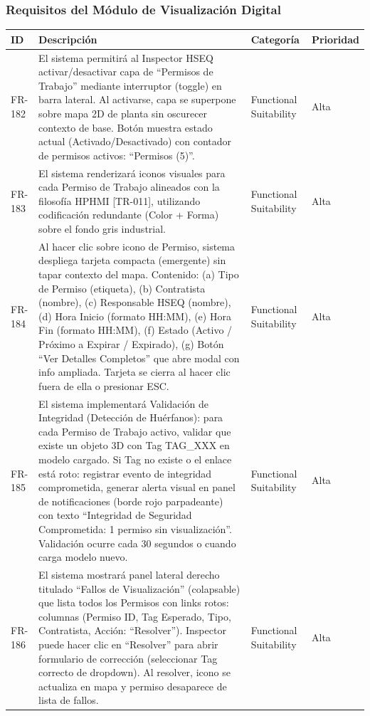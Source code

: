 \subsubsection{Requisitos del Módulo de Visualización Digital}
\footnotesize
\begin{longtable}{>{\raggedright\arraybackslash}p{} >{\raggedright\arraybackslash}p{} >{\raggedright\arraybackslash}p{} >{\raggedright\arraybackslash}p{}}
\toprule
\rowcolor{gray!15}\textbf{ID} & \textbf{Descripción} & \textbf{Categoría} & \textbf{Prioridad} \\ \midrule
\endhead
FR-182 & El sistema permitirá al Inspector HSEQ activar/desactivar capa de ``Permisos de Trabajo'' mediante interruptor (toggle) en barra lateral. Al activarse, capa se superpone sobre mapa 2D de planta sin oscurecer contexto de base. Botón muestra estado actual (Activado/Desactivado) con contador de permisos activos: ``Permisos (5)''. & Functional Suitability & Alta \\
FR-183 & El sistema renderizará iconos visuales para cada Permiso de Trabajo alineados con la filosofía HPHMI [TR-011], utilizando codificación redundante (Color + Forma) sobre el fondo gris industrial. & Functional Suitability & Alta \\
FR-184 & Al hacer clic sobre icono de Permiso, sistema despliega tarjeta compacta (emergente) sin tapar contexto del mapa. Contenido: (a) Tipo de Permiso (etiqueta), (b) Contratista (nombre), (c) Responsable HSEQ (nombre), (d) Hora Inicio (formato HH:MM), (e) Hora Fin (formato HH:MM), (f) Estado (Activo / Próximo a Expirar / Expirado), (g) Botón ``Ver Detalles Completos'' que abre modal con info ampliada. Tarjeta se cierra al hacer clic fuera de ella o presionar ESC. & Functional Suitability & Alta \\
FR-185 & El sistema implementará Validación de Integridad (Detección de Huérfanos): para cada Permiso de Trabajo activo, validar que existe un objeto 3D con Tag TAG\_XXX en modelo cargado. Si Tag no existe o el enlace está roto: registrar evento de integridad comprometida, generar alerta visual en panel de notificaciones (borde rojo parpadeante) con texto ``Integridad de Seguridad Comprometida: 1 permiso sin visualización''. Validación ocurre cada 30 segundos o cuando carga modelo nuevo. & Functional Suitability & Alta \\
FR-186 & El sistema mostrará panel lateral derecho titulado ``Fallos de Visualización'' (colapsable) que lista todos los Permisos con links rotos: columnas (Permiso ID, Tag Esperado, Tipo, Contratista, Acción: ``Resolver''). Inspector puede hacer clic en ``Resolver'' para abrir formulario de corrección (seleccionar Tag correcto de dropdown). Al resolver, icono se actualiza en mapa y permiso desaparece de lista de fallos. & Functional Suitability & Alta \\

\end{longtable}
